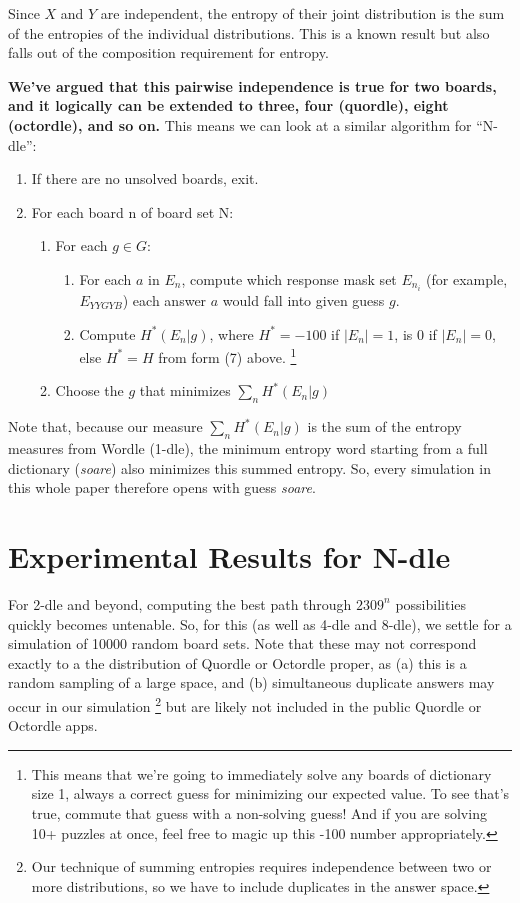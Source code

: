 \documentclass[11pt, oneside]{article} 	%
\begin{document}
Since $X$ and $Y$ are independent, the entropy of their joint distribution is the sum of the entropies of the individual distributions. This is a known result \cite{3} but also falls out of the composition requirement for entropy.


\textbf{We've argued that this pairwise independence is true for two boards, and it logically can be extended to three, four (quordle), eight (octordle), and so on.} This means we can look at a similar algorithm for ``N-dle'':

\begin{enumerate}
\item If there are no unsolved boards, exit.
\item For each board n of board set N:
 \begin{enumerate}
 \item For each $g \in G$: 
 \begin{enumerate}
 \item For each $a$ in $E_n$, compute which response mask set $E_{n_i}$ (for example, $E_{YYGYB}$) each answer $a$ would fall into given guess $g$.
 \item Compute $H^*(E_n | g)$, where $H^* = -100$ if $|E_n| = 1$, is 0 if $|E_n| = 0$, else $H^* = H$ from form (7) above. \footnote{This means that we're going to immediately solve any boards of dictionary size 1, always a correct guess for minimizing our expected value. To see that's true, commute that guess with a non-solving guess! And if you are solving 10+ puzzles at once, feel free to magic up this -100 number appropriately.}
 \end{enumerate}
 \item Choose the $g$ that minimizes $\sum_{n}H^*(E_n | g)$ 
\end{enumerate}
\end{enumerate}

Note that, because our measure $\sum_{n}H^*(E_n | g)$ is the sum of the entropy measures from Wordle (1-dle), the minimum entropy word starting from a full dictionary (\emph{soare}) also minimizes this summed entropy.  So, every simulation in this whole paper therefore opens with guess \emph{soare}.

\section{Experimental Results for N-dle}
For 2-dle and beyond, computing the best path through $2309^n$ possibilities quickly becomes untenable. So, for this (as well as 4-dle and 8-dle), we settle for a simulation of 10000 random board sets. 
Note that these may not correspond exactly to a the distribution of Quordle or Octordle proper, as (a) this is a random sampling of a large space, and (b) simultaneous duplicate answers may occur in our simulation \footnote{Our technique of summing entropies requires independence between two or more distributions, so we have to include duplicates in the answer space.} but are likely not included in the public Quordle or Octordle apps.
\end{document}
